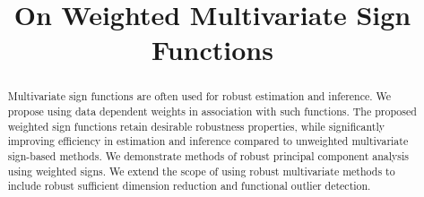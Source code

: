\documentclass[ejs]{imsart}
\theoremstyle{definition} \newtheorem{Definition}[Theorem]{Definition}
\begin{document}
\begin{frontmatter}
\title{On Weighted Multivariate Sign Functions}


\begin{abstract}
Multivariate sign functions are often used for robust estimation and inference. 
We propose using data dependent weights in association with such functions. 
The proposed weighted sign functions  retain desirable 
robustness properties, while significantly improving efficiency in estimation and 
inference compared to unweighted multivariate sign-based methods. We demonstrate 
methods of robust principal component analysis using weighted signs. We extend 
the scope of using robust multivariate methods to include robust sufficient dimension
 reduction and functional outlier detection.
\end{abstract}

\begin{keyword}[class=MSC]
\end{keyword}

\begin{keyword}
\end{keyword}
\tableofcontents
\end{frontmatter}
\end{document}
